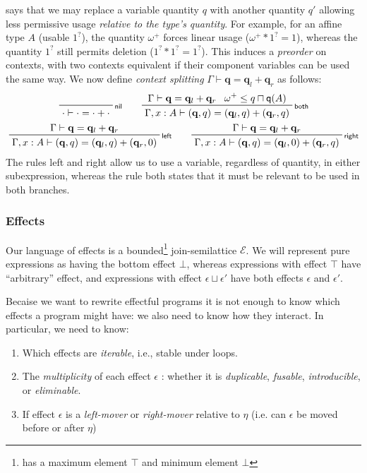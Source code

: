 \documentclass[acmsmall,screen,review]{acmart}
\newcommand{\mc}[1]{\ensuremath{\mathcal{#1}}}
\newcommand{\mb}[1]{\ensuremath{\mathbf{#1}}}
\newcommand{\ms}[1]{\ensuremath{\mathsf{#1}}}
\newcommand{\qsp}[4]{#1 \vdash #2 = #3 + #4}
\newcommand{\rle}[1]{{\scriptsize\textsf{#1}}}
\newcommand{\brle}[1]{{\textsf{#1}}}
\newcommand{\zeroq}{0}
\newcommand{\delq}{1^?}
\newcommand{\cpyq}{\omega^+}
\newcommand{\alquant}{\ms{q}}
\begin{document}
says that we may replace a variable quantity $q$ with another quantity $q'$ allowing
less permissive usage \emph{relative to the type's quantity}. For example, for an affine
type $A$ (usable $\delq$), the quantity $\cpyq$ forces linear usage ($\cpyq \ast \delq = 1$), whereas
the quantity $\delq$ still permits deletion ($\delq \ast \delq = \delq$). This induces a \emph{preorder} on
contexts, with two contexts equivalent if their component variables can be used the same way.
%
We now  define \emph{context splitting} $\qsp{\Gamma}{\mb{q}}{\mb{q}_l}{\mb{q}_r}$ as
follows:
\begin{gather*}
  \prftree[r]{\rle{nil}}
    {\qsp{\cdot}{\cdot}{\cdot}{\cdot}} \qquad
  \prftree[r]{\rle{both}}
    {\qsp{\Gamma}{\mb{q}}{\mb{q}_l}{\mb{q}_r}}
    {\cpyq \leq q \sqcap \alquant(A)}
    {\qsp{\Gamma, x : A}{(\mb{q}, q)}{(\mb{q}_l, q)}{(\mb{q}_r, q)}}
    \\
  \prftree[r]{\rle{left}}
    {\qsp{\Gamma}{\mb{q}}{\mb{q}_l}{\mb{q}_r}}
    {\qsp{\Gamma, x : A}{(\mb{q}, q)}{(\mb{q}_l, q)}{(\mb{q}_r, \zeroq)}} \qquad
  \prftree[r]{\rle{right}}
    {\qsp{\Gamma}{\mb{q}}{\mb{q}_l}{\mb{q}_r}}
    {\qsp{\Gamma, x : A}{(\mb{q}, q)}{(\mb{q}_l, \zeroq)}{(\mb{q}_r, q)}}
\end{gather*}
The rules \brle{left} and \brle{right} allow us to use a variable, regardless of quantity, in either
subexpression, whereas the rule \brle{both} states that it must be relevant to be used in both branches.

\subsubsection{Effects}
Our language of effects is a bounded\footnote{has a maximum element $\top$ and minimum element
$\bot$} join-semilattice $\mc{E}$. We will represent pure expressions as having the bottom effect
$\bot$, whereas expressions with effect $\top$ have ``arbitrary'' effect, and expressions with
effect $\epsilon \sqcup \epsilon'$ have both effects $\epsilon$ and $\epsilon'$.

Becaise we want to rewrite effectful programs it is not
enough to know which effects a program might have: we also need to know how they
interact. In particular, we need to know:
\begin{enumerate}
  \item Which effects are \emph{iterable}, i.e., stable under loops. 
  \item The \emph{multiplicity} of each effect $\epsilon$ : whether it
  is \emph{duplicable}, \emph{fusable}, \emph{introducible}, or \emph{eliminable}.
  \item If effect $\epsilon$ is a \emph{left-mover} or \emph{right-mover} relative to $\eta$  (i.e. can $\epsilon$ be moved before or after $\eta$) 
\end{enumerate}
\end{document}

